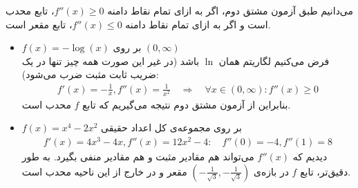 \begin{ابجد}
\begin{itemize}
\end{itemize}

\item می‌دانیم طبق آزمون مشتق دوم، اگر به ازای تمام نقاط دامنه $f'' (x) \geq 0$، تابع محدب است و اگر به ازای تمام نقاط دامنه $f''(x) \leq 0$، تابع مقعر است.

\begin{itemize}
    \item $f(x) = -\log(x)$ بر روی $(0, \infty)$ \\ فرض می‌کنیم لگاریتم همان $\ln$ باشد (در غیر این صورت همه چیز تنها در یک ضریب ثابت مثبت ضرب می‌شود):
          \begin{align*}
              f'(x) = -\frac{1}{x}, f''(x) = \frac{1}{x^2} \quad \Rightarrow \quad \forall x \in (0, \infty): f''(x) \geq 0
          \end{align*}
          بنابراین از آزمون مشتق دوم نتیجه می‌گیریم که تابع $f$ محدب است.

    \item $f(x) = x^4 - 2x^2$ بر روی مجموعه‌ی کل اعداد حقیقی \\
          \begin{align*}
              f'(x) = 4x^3 - 4x, f''(x) = 12x^2 - 4: \quad f''(0) = -4, f''(1) = 8
          \end{align*}
          دیدیم که $f''(x)$ می‌تواند هم مقادیر مثبت و هم مقادیر منفی بگیرد. به طور دقیق‌تر، تابع $f$ در بازه‌ی $(-\frac{1}{\sqrt{3}}, -\frac{1}{\sqrt{3}})$ مقعر و در خارج از این ناحیه محدب است.

\end{itemize}

\end{ابجد}